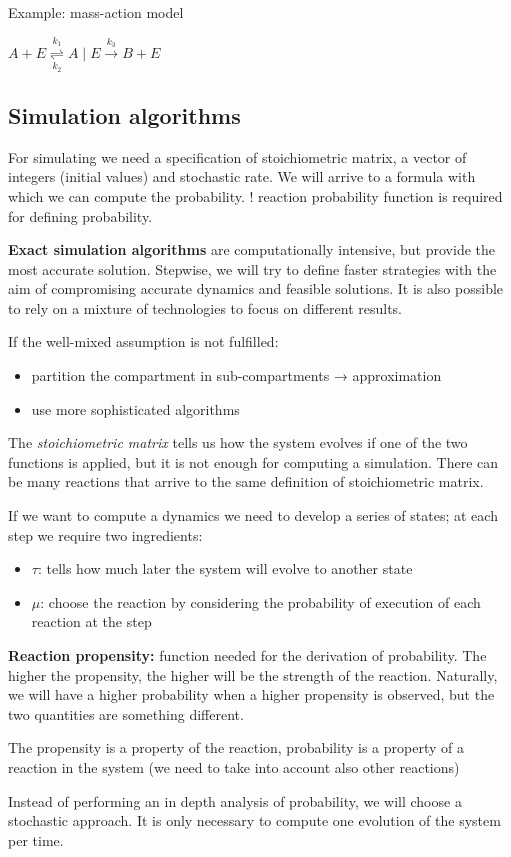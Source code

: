 Example: mass-action model

\(A+E \underset{k_2}{\overset{k_1}{\rightleftharpoons}} A \mid E \stackrel{k_3}{\longrightarrow} B+E\)

\hypertarget{simulation-algorithms}{%
\subsection{Simulation algorithms}\label{simulation-algorithms}}

For simulating we need a specification of stoichiometric matrix, a
vector of integers (initial values) and stochastic rate. We will arrive
to a formula with which we can compute the probability. ! reaction
probability function is required for defining probability.

\textbf{Exact simulation algorithms} are computationally intensive, but
provide the most accurate solution. Stepwise, we will try to define
faster strategies with the aim of compromising accurate dynamics and
feasible solutions. It is also possible to rely on a mixture of
technologies to focus on different results.

If the well-mixed assumption is not fulfilled:

\begin{itemize}
\tightlist
\item
  partition the compartment in sub-compartments → approximation
\item
  use more sophisticated algorithms
\end{itemize}

The \emph{stoichiometric matrix} tells us how the system evolves if one
of the two functions is applied, but it is not enough for computing a
simulation. There can be many reactions that arrive to the same
definition of stoichiometric matrix.

If we want to compute a dynamics we need to develop a series of states;
at each step we require two ingredients:

\begin{itemize}
\tightlist
\item
  \(\tau\): tells how much later the system will evolve to another state
\item
  \(\mu\): choose the reaction by considering the probability of
  execution of each reaction at the step
\end{itemize}

\textbf{Reaction propensity:} function needed for the derivation of
probability. The higher the propensity, the higher will be the strength
of the reaction. Naturally, we will have a higher probability when a
higher propensity is observed, but the two quantities are something
different.

The propensity is a property of the reaction, probability is a property
of a reaction in the system (we need to take into account also other
reactions)

Instead of performing an in depth analysis of probability, we will
choose a stochastic approach. It is only necessary to compute one
evolution of the system per time.
